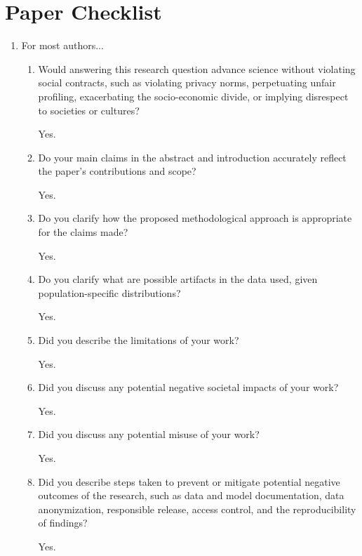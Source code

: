 \documentclass[letterpaper]{article} %
\newcommand{\answerTODO}[1]{#1}
\begin{document}
\section*{Paper Checklist}
\begin{enumerate}

\item For most authors...
\begin{enumerate}
    \item Would answering this research question advance science without violating social contracts, such as violating privacy norms, perpetuating unfair profiling, exacerbating the socio-economic divide, or implying disrespect to societies or cultures?
    
    \answerTODO{Yes.}

  \item Do your main claims in the abstract and introduction accurately reflect the paper's contributions and scope?
    
    \answerTODO{Yes.}

  \item Do you clarify how the proposed methodological approach is appropriate for the claims made?
    
    \answerTODO{Yes.}

  \item Do you clarify what are possible artifacts in the data used, given population-specific distributions?
    
    \answerTODO{Yes.}

  \item Did you describe the limitations of your work?
    
    \answerTODO{Yes.}

  \item Did you discuss any potential negative societal impacts of your work?
    
    \answerTODO{Yes.}

  \item Did you discuss any potential misuse of your work?
    
    \answerTODO{Yes.}

  \item Did you describe steps taken to prevent or mitigate potential negative outcomes of the research, such as data and model documentation, data anonymization, responsible release, access control, and the reproducibility of findings?
    
    \answerTODO{Yes.}


\end{enumerate}
\end{enumerate}
\end{document}

